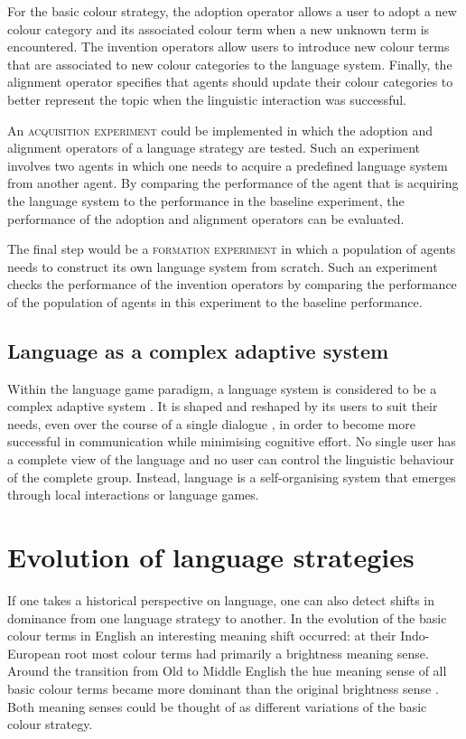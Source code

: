 For the basic colour strategy, the adoption operator allows a user to
adopt a new colour category and its associated colour term when a new
unknown term is encountered. The invention operators allow users to
introduce new colour terms that are associated to new colour
categories to the language system. Finally, the alignment operator
specifies that agents should update their colour categories to better
represent the topic when the linguistic interaction was successful.

An \textsc{acquisition experiment} could be implemented in which the
adoption and alignment operators of a language strategy are
tested. Such an experiment involves two agents in which one needs to
acquire a predefined language system from another agent. By comparing
the performance of the agent that is acquiring the language system to
the performance in the baseline experiment, the performance of the
adoption and alignment operators can be evaluated.

The final step would be a \textsc{formation experiment} in which a
population of agents needs to construct its own language system from
scratch. Such an experiment checks the performance of the invention
operators by comparing the performance of the population of agents in
this experiment to the baseline performance.

\subsection{Language as a complex adaptive system}
 
Within the language game paradigm, a language system is considered to
be a complex adaptive system \citep{steels00language}. It is shaped
and reshaped by its users to suit their needs, even over the course of
a single dialogue \citep{garrod94conversation}, in order to become
more successful in communication while minimising cognitive effort. No
single user has a complete view of the language and no user can
control the linguistic behaviour of the complete group. Instead,
language is a self-organising system that emerges through local
interactions or language games.

\section{Evolution of language strategies}

If one takes a historical perspective on language, one can also
detect shifts in dominance from one language strategy to another. In
the evolution of the basic colour terms in English an interesting
meaning shift occurred: at their Indo-European root most colour terms
had primarily a brightness meaning sense. Around the transition from
Old to Middle English the hue meaning sense of all basic colour terms became
more dominant than the original brightness sense
\citep{casson97shift}. Both meaning senses could be thought of as
different variations of the basic colour strategy.

